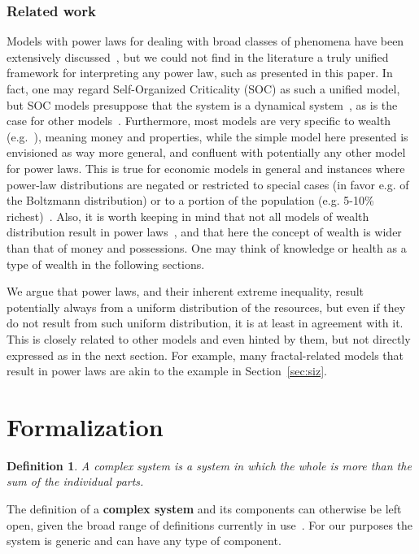 \documentclass[10pt,letterpaper]{article}
\newtheorem{definition2}[theorem3]{Definition}
\begin{document}
\subsubsection*{Related work}\label{sec:related}
Models with power laws for dealing with broad classes of phenomena have been extensively discussed~\cite{part,pbook,cereus},
but we could not find in the literature a truly unified framework for interpreting any power law, such as presented in this paper.
In fact, one may regard Self-Organized Criticality (SOC) as such a unified model, but SOC models presuppose that the system is a dynamical system~\cite{part}, as is the case for other models~\cite{slanina}.
Furthermore, most models are very specific to wealth (e.g.~\cite{bouchard}), meaning money and properties, while the simple model here presented is envisioned as way more general, and confluent with potentially any other model for power laws.
This is true for economic models in general and instances where power-law distributions are negated or restricted to special cases (in favor e.g. of the Boltzmann distribution) or to a portion of the population (e.g. 5-10\% richest)~\cite{arnab}.
Also, it is worth keeping in mind that not all models of wealth distribution result in power laws~\cite{dragulescu}, and that here the concept of wealth is wider than that of money and possessions. One may think of knowledge or health as a type of wealth in the following sections.

We argue that power laws, and their inherent extreme inequality, result potentially always from a uniform distribution of the resources, but even if they do not result from such uniform distribution, it is at least in agreement with it.
This is closely related to other models and even hinted by them, but not directly expressed as in the next section.
For example, many fractal-related models that result in power laws are akin to the example in Section~\ref{sec:siz}.

\section{Formalization}\label{sec:form}

\begin{definition2}
A complex system is a system in which the whole is more than the sum of the individual parts.
\end{definition2}

The definition of a {\bf complex system} and its components 
can otherwise be left open, given the broad range of definitions currently in use~\cite{complexity}.
For our purposes the system is generic and can have any type of component.
\end{document}
